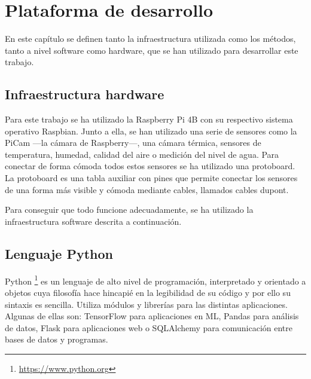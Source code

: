 \chapter{Plataforma de desarrollo}
\label{cap:capitulo3}



\vspace{1cm}

En este capítulo se definen tanto la infraestructura utilizada como los métodos, tanto a nivel software como hardware, que se han utilizado para desarrollar este trabajo.\\

\section{Infraestructura hardware}
\label{sec:hw}
Para este trabajo se ha utilizado la Raspberry Pi 4B con su respectivo sistema operativo Raspbian. Junto a ella, se han utilizado una serie de sensores como la PiCam ---la cámara de Raspberry---, una cámara térmica, sensores de temperatura, humedad, calidad del aire o medición del nivel de agua. Para conectar de forma cómoda todos estos sensores se ha utilizado una protoboard. La protoboard es una tabla auxiliar con pines que permite conectar los sensores de una forma más visible y cómoda mediante cables, llamados cables dupont.

Para conseguir que todo funcione adecuadamente, se ha utilizado la infraestructura software descrita a continuación.\\
 
\section{Lenguaje Python}
\label{sec:python}
Python \footnote{\url{https://www.python.org}} es un lenguaje de alto nivel de programación, interpretado y orientado a objetos cuya filosofía hace hincapié en la legibilidad de su código y por ello su sintaxis es sencilla. Utiliza módulos y librerías para las distintas aplicaciones. Algunas de ellas son: TensorFlow para aplicaciones en ML, Pandas para análisis de datos, Flask para aplicaciones web o SQLAlchemy para comunicación entre bases de datos y programas.

